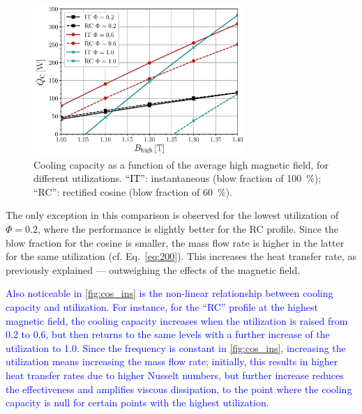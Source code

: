 \documentclass[referee]{svjour3}
\begin{document}
\begin{figure}[!ht]
  \centering
\includegraphics[width=8cm]{Fig7-Qc_B_comp_f_1_same_minimum}
  \caption{Cooling capacity as a function of the  average high magnetic field, for different utilizations. \textcolor{black}{``IT''}: instantaneous (blow fraction of \SI{100}{\percent}); ``RC'': rectified cosine  (blow fraction of \SI{60}{\percent}).}
 \label{fig:cos_ins}
\end{figure}

The only exception in this comparison is observed for the lowest utilization of $\Phi = 0.2$, where the performance is slightly better for the RC profile. Since the blow fraction for the cosine is smaller, the mass flow rate is higher in the latter for the same utilization (cf. Eq.~\eqref{eq:200}). This increases the heat transfer rate, as previously explained ---  outweighing the effects of the magnetic field.

\textcolor{blue}{Also noticeable in \autoref{fig:cos_ins} is the non-linear relationship  between cooling capacity and utilization. For instance, for the ``RC'' profile at the highest magnetic field, the cooling capacity increases when the utilization is raised from 0.2 to 0.6, but then returns to the same levels with a further increase of the utilization to 1.0. Since the frequency is constant in \autoref{fig:cos_ins}, increasing the utilization means increasing the mass flow rate; initially, this results in higher heat transfer rates due to higher Nusselt numbers, but further increase reduces the effectiveness and amplifies viscous dissipation, to the point where the cooling capacity is null for certain points with the highest utilization.} 
\end{document}

